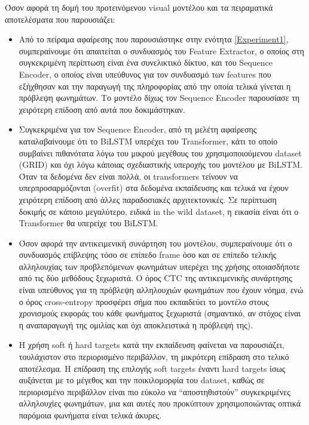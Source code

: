 Όσον αφορά τη δομή του προτεινόμενου visual μοντέλου και τα πειραματικά αποτελέσματα που παρουσιάζει:

\begin{itemize}
\item Από το πείραμα αφαίρεσης που παρουσιάστηκε στην ενότητα \ref{Experiment1}, συμπεραίνουμε ότι απαιτείται ο συνδυασμός του Feature Extractor, ο οποίος στη συγκεκριμένη περίπτωση είναι ένα συνελικτικό δίκτυο, και του Sequence Encoder, ο οποίος είναι υπεύθυνος για τον συνδυασμό των features που εξήχθησαν και την παραγωγή της πληροφορίας από την οποία τελικά γίνεται η πρόβλεψη φωνημάτων. Το μοντέλο δίχως τον Sequence Encoder παρουσίασε τη χειρότερη επίδοση από αυτά που δοκιμάστηκαν.

\item Συγκεκριμένα για τον Sequence Encoder, από τη μελέτη αφαίρεσης καταλαβαίνουμε ότι το BiLSTM υπερέχει του Transformer, κάτι το οποίο συμβαίνει πιθανότατα λόγω του μικρού μεγέθους του χρησιμοποιούμενου dataset (GRID) και όχι λόγω κάποιας σχεδιαστικής υπεροχής του μοντέλου με BiLSTM. Όταν τα δεδομένα δεν είναι πολλά, οι transformers τείνουν να υπερπροσαρμόζονται (overfit) στα δεδομένα εκπαίδευσης και τελικά να έχουν χειρότερη επίδοση από άλλες παραδοσιακές αρχιτεκτονικές. Σε περίπτωση δοκιμής σε κάποιο μεγαλύτερο, ειδικά in the wild dataset, η εικασία είναι ότι ο Transformer θα υπερείχε του BiLSTM.

\item Όσον αφορά την αντικειμενική συνάρτηση του μοντέλου, συμπεραίνουμε ότι ο συνδυασμός επίβλεψης τόσο σε επίπεδο frame όσο και σε επίπεδο τελικής αλληλουχίας των προβλεπόμενων φωνημάτων υπερέχει της χρήσης οποιασδήποτε από τις δύο μεθόδους ξεχωριστά. Ο όρος CTC της αντικειμενικής συνάρτησης είναι υπεύθυνος για τη πρόβλεψη αλληλουχιών φωνημάτων που έχουν νόημα, ενώ ο όρος cross-entropy προσφέρει σήμα που εκπαιδεύει το μοντέλο στους χρονισμούς εκφοράς του κάθε φωνήματος ξεχωριστά (σημαντικό, αν στόχος είναι η αναπαραγωγή της ομιλίας και όχι αποκλειστικά η πρόβλεψή της).

\item Η χρήση soft ή hard targets κατά την εκπαίδευση φαίνεται να παρουσιάζει, τουλάχιστον στο περιορισμένο περιβάλλον, τη μικρότερη επίδραση στο τελικό αποτέλεσμα. Η επίδραση της επιλογής soft targets έναντι hard targets ίσως αυξάνεται με το μέγεθος και την ποικιλομορφία του dataset, καθώς σε περιορισμένο περιβάλλον είναι πιο εύκολο να ``αποστηθιστούν'' συγκεκριμένες αλληλουχίες φωνημάτων, μια και αυτές που προκύπτουν χρησιμοποιώντας οπτικά παρόμοια φωνήματα είναι τελικά άκυρες.


\end{itemize}
